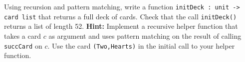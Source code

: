 Using recursion and pattern matching, write a
function \lstinline{initDeck : unit -> card list} that returns a full
deck of cards. Check that the call \lstinline{initDeck()} returns a
list of length 52. \textbf{Hint:} Implement a recursive helper
function that takes a card $c$ as argument and uses pattern matching
on the result of calling \lstinline{succCard} on $c$. Use the
card \lstinline{(Two,Hearts)} in the initial call to your helper
function.


%
